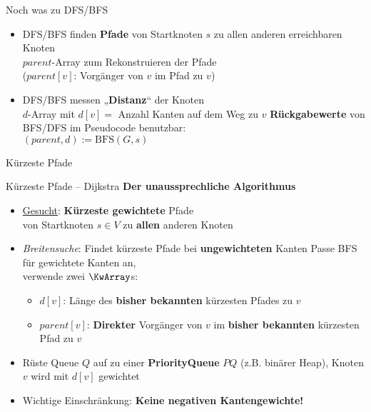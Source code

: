 



\morescalingdelimiters


	
	
\begin{frame}{Noch was zu DFS/BFS}
	\begin{itemize}
		\item DFS/BFS finden \textbf{Pfade} von Startknoten $s$ zu allen anderen erreichbaren Knoten \\
		\impl $parent$-Array zum Rekonstruieren der Pfade \\
		{\small ($parent[v]$: Vorgänger von $v$ im Pfad zu $v$)}
		\item DFS/BFS messen „\textbf{Distanz}“ der Knoten \\
		\impl $d$-Array mit $d[v] = $ Anzahl Kanten auf dem Weg zu $v$ 
		\Implitem \textbf{Rückgabewerte} von BFS/DFS im Pseudocode benutzbar: \\
		$(parent, d) := \text{BFS}(G, s)$  \\
	\end{itemize}
\end{frame}

\begin{headframe}
	Kürzeste Pfade
\end{headframe}
	
\begin{frame}{Kürzeste Pfade – Dijkstra}
	\textbf{Der unaussprechliche Algorithmus} 
	\begin{itemize}
		\item \underline{Gesucht}: \textbf{Kürzeste gewichtete} Pfade \\
		von Startknoten $s \in V$ zu \textbf{allen} anderen Knoten
		\pause
		\item \textit{Breitensuche}: Findet kürzeste Pfade bei \textbf{ungewichteten} Kanten
		\pause
		\implitem Passe BFS für gewichtete Kanten an, \\
		verwende zwei $\KwArray$s:
		\begin{itemize}
			\item $d[v]$: Länge des \textbf{bisher bekannten} kürzesten Pfades zu $v$ 
			\vspace{.2\baselineskip}
			\item $parent[v]$: \textbf{Direkter} Vorgänger von $v$ im \textbf{bisher bekannten} kürzesten Pfad zu $v$
		\end{itemize}
		\pause
		\item Rüste Queue $Q$ auf zu einer \textbf{PriorityQueue} $PQ$ (z.B. binärer Heap), Knoten $v$ wird mit $d[v]$ gewichtet
		\pause
		\item Wichtige Einschränkung: \textbf{Keine negativen Kantengewichte!}
	\end{itemize}
\end{frame}

